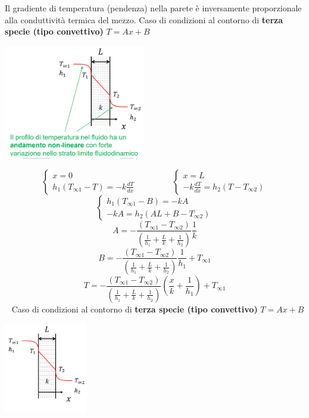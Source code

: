 Il gradiente di temperatura (pendenza) nella parete è inversamente proporzionale alla conduttività termica del mezzo.\newline
\newline
Caso di condizioni al contorno di \textbf{terza specie (tipo convettivo)} $T= Ax + B$
\begin{center}
    \includegraphics[height=5cm]{../L10/img4.PNG}
\end{center}
\[
    \begin{cases}
        x = 0 \\ h_1(T_{\infty 1}-T) = -k \frac{dT}{dx}
    \end{cases} \;\;\;\;\;\;\;\;\;\;\;\;\;\;\; \begin{cases}
        x = L\\ -k \frac{dT}{dx} = h_2(T-T_{\infty 2})
    \end{cases}
\]
\[
    \begin{cases}
        h_1(T_{\infty 1} - B) = -k A \\ -kA = h_2 (AL+B - T_{\infty 2})
    \end{cases}
\]
\[
    A = - \frac{(T_{\infty 1} - T_{\infty 2})}{\left(\frac{1}{h_1} + \frac{L}{k} + \frac{1}{h_2}\right)} \frac{1}{k}
\]
\[
    B = -\frac{(T_{\infty 1} - T_{\infty 2})}{\left(\frac{1}{h_1} + \frac{L}{k} + \frac{1}{h_2}\right)} \frac{1}{h_1} + T_{\infty 1}
\]
\[
    T = - \frac{(T_{\infty 1} - T_{\infty 2})}{\left(\frac{1}{h_1} + \frac{L}{k} + \frac{1}{h_2}\right)}\left(\frac{x}{k} + \frac{1}{h_1}\right) + T_{\infty 1}
\]
\ \newline
\newline
Caso di condizioni al contorno di \textbf{terza specie (tipo convettivo)} $T = Ax + B$
\begin{center}
    \includegraphics[height=4cm]{../L10/img5.PNG}
\end{center}

